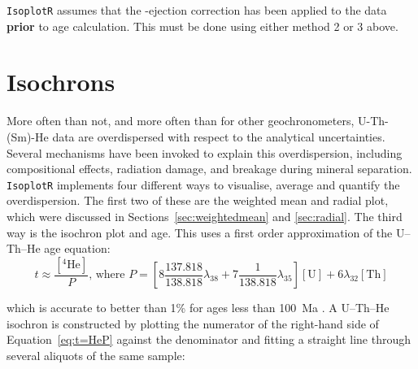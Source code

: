 \begin{refsection}
\texttt{IsoplotR} assumes that the \textalpha-ejection correction has
been applied to the data \textbf{prior} to age calculation. This must
be done using either method 2 or 3 above.

\section{Isochrons}

More often than not, and more often than for other geochronometers,
U-Th-(Sm)-He data are overdispersed with respect to the analytical
uncertainties. Several mechanisms have been invoked to explain this
overdispersion, including compositional effects, radiation damage, and
breakage during mineral separation.\\

\texttt{IsoplotR} implements four different ways to visualise, average
and quantify the overdispersion.  The first two of these are the
weighted mean and radial plot, which were discussed in
Sections~\ref{sec:weightedmean} and \ref{sec:radial}. The third way is
the isochron plot and age. This uses a first order approximation of
the U--Th--He age equation:
\begin{equation}
  t \approx \frac{\left[{}^{4}\mbox{He}\right]}{P} \mbox{,~where~} P =
  \left[8 \frac{137.818}{138.818} \lambda_{38} + 7 \frac{1}{138.818}
    \lambda_{35} \right] [\mbox{U}] + 6 \lambda_{32} [\mbox{Th}]
    \label{eq:t=HeP}
\end{equation}

\noindent which is accurate to better than 1\% for ages less than
100~Ma \citep{vermeesch2008a}. A U--Th--He isochron is constructed by
plotting the numerator of the right-hand side of
Equation~\ref{eq:t=HeP} against the denominator and fitting a straight
line through several aliquots of the same sample:\\


\end{refsection}
